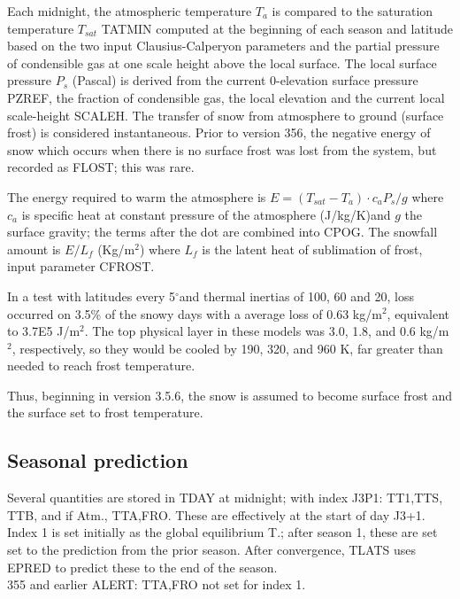 \documentclass{article}
\newcommand{\qd}{$^\circ$}        %
\begin{document}
 Each midnight, the atmospheric temperature $T_a$ is compared to the saturation
 temperature $T_{sat}$ TATMIN computed at the beginning of each season and
 latitude based on the two input Clausius-Calperyon parameters and the partial
 pressure of condensible gas at one scale height above the local surface. The
 local surface pressure $P_s$ (Pascal) is derived from the current 0-elevation
 surface pressure PZREF, the fraction of condensible gas, the local elevation
 and the current local scale-height SCALEH. The transfer of snow from atmosphere
 to ground (surface frost) is considered instantaneous. Prior to version 356,
 the negative energy of snow which occurs when there is no surface frost was lost
 from the system, but recorded as FLOST; this was rare.

 The energy required to warm the atmosphere is $E= (T_{sat}-T_a) \cdot c_a
 P_s/g$ where $c_a$ is specific heat at constant pressure of the atmosphere
 (J/kg/K)and $g$ the surface gravity; the terms after the dot are combined into
 CPOG. The snowfall amount is $E/L_f$ (Kg/m$^2$) where $L_f$ is the latent heat of
 sublimation of frost, input parameter CFROST.

 In a test with latitudes every 5\qd and thermal inertias of 100, 60 and 20,
 loss occurred on 3.5\% of the snowy days with a average loss of 0.63 kg/m$^2$,
 equivalent to 3.7E5 J/m$^2$. The top physical layer in these models was 3.0,
 1.8, and 0.6 kg/m$^2$, respectively, so they would be cooled by 190, 320, and
 960 K, far greater than needed to reach frost temperature.

Thus, beginning in version 3.5.6, the snow is assumed to become surface frost
and the surface set to frost temperature.


\subsection{Seasonal prediction} %

Several quantities are stored in TDAY at midnight;
 with index J3P1: TT1,TTS, TTB, and if Atm., TTA,FRO. These are effectively at the start of day J3+1. Index 1 is set initially as the global equilibrium T.; after season 1, these are set set to the prediction from the prior season.
After convergence, TLATS uses EPRED to predict these to the end of the season.
\\ 355 and earlier ALERT:  TTA,FRO not set for index 1.
\end{document}
